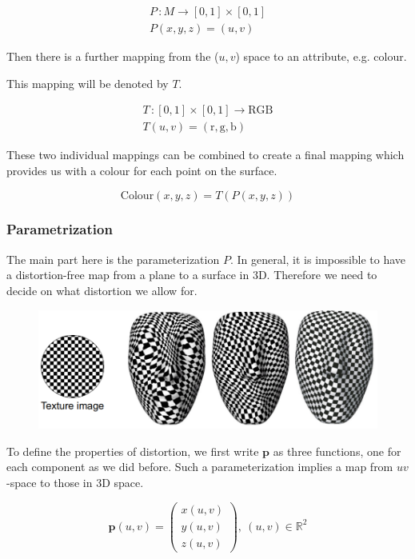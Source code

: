 \documentclass{article}
\begin{document}
\begin{gather*}
    P\, : M \to [0,1] \times [0,1] \\
    P(x,y,z) = (u,v)
\end{gather*}

\vspace{5px}

Then there is a further mapping from the (\(u,v\)) space to an attribute, e.g. colour.

This mapping will be denoted by \(T\).

\begin{gather*}
    T \, : [0,1] \times [0,1] \to  \text{RGB} \\
    T(u,v) = (\text{r},\text{g},\text{b})
\end{gather*}

\vspace{5px}

These two individual mappings can be combined to create a final mapping which provides us with a colour
for each point on the surface.

\[
    \text{Colour}(x,y,z) = T(P(x, y, z))
\]

\subsubsection{Parametrization}

The main part here is the parameterization \(P\). In general, it is impossible to have a distortion-free
map from a plane to a surface in 3D. Therefore we need to decide on what distortion we allow for.

\begin{figure}[!ht]
    \centering
    \includegraphics[width=0.5\linewidth]{images/distortion_example.png}
\end{figure}


To define the properties of distortion, we first write \(\mathbf{p}\) as three functions, one for each
component as we did before. Such a parameterization implies a map from \(uv\)-space to those in 3D space.

\[
    \mathbf{p}(u,v) = 
    \begin{pmatrix}
        x(u,v) \\ 
        y(u,v) \\
        z(u,v)
    \end{pmatrix}\!, \ (u,v) \in \mathbb{R}^2
\]
\end{document}
